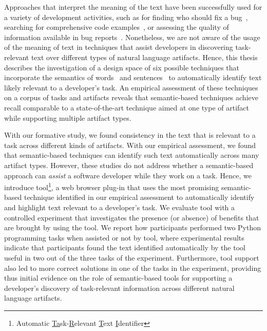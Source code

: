 Approaches that interpret the meaning of the text have been successfully used for a variety of development activities,
such as for finding who should fix a bug~\cite{yang2016}, searching for comprehensive code examples~\cite{silva2019}, or assessing the quality of information available in bug reports~\cite{chaparro2019}.
Nonetheless, we are not aware of the usage of the meaning of text in techniques 
that assist developers in discovering task-relevant text over different types of natural language artifacts.
Hence, this thesis describes the investigation of a design space
of six possible techniques that incorporate the semantics of words~\cite{Mikolov2013, Devlin2018Bert}
and sentences~\cite{fillmore1976frame, marques2021}
to automatically identify text likely relevant to a developer's task.
An empirical assessment of these techniques 
on a corpus of tasks
and artifacts reveals that semantic-based techniques
achieve recall comparable to a state-of-the-art technique aimed at one type of artifact~\cite{Xu2017}
while supporting
multiple artifact types.






With our formative study, we found consistency in the text  that is relevant to a task across different kinds of artifacts.
With our empirical assessment, we found that semantic-based techniques can identify such text
automatically across many artifact types.
However, these studies do not address whether a semantic-based approach can \textit{assist} a software developer while they work on a task.
Hence, we introduce \acs{tool}\footnote{
    Automatic \underline{Ta}sk-\underline{R}elevant \underline{T}ext \underline{I}dentifier
}, a web browser plug-in that 
uses the most promising semantic-based technique identified in our empirical assessment
to automatically identify and highlight text relevant to a developer's task.
We evaluate \acs{tool} with a controlled experiment that investigates the presence (or absence) of benefits that are brought by using the tool.
We report how  participants 
performed two Python programming tasks when 
 assisted or not by \acs{tool},
where experimental results indicate that participants found the text identified automatically
by the tool 
useful in two out of the three tasks of the experiment.
Furthermore, tool support also led to more correct solutions 
in one of the tasks in the experiment, providing thus
initial evidence on the role of semantic-based tools 
for supporting a developer's discovery of task-relevant information
across different natural language artifacts.
